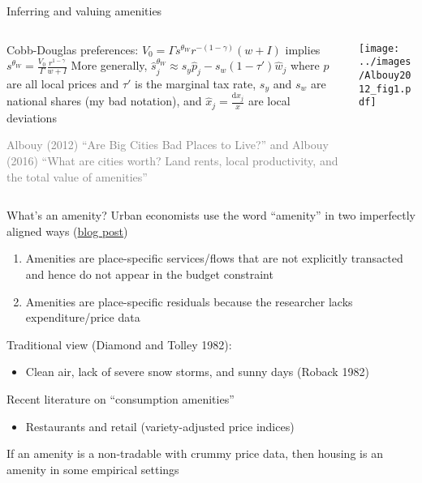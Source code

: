 \documentclass[11pt,notes=hide,aspectratio=169]{beamer}
\begin{document}
\begin{frame}{Inferring and valuing amenities}
\begin{columns}
\begin{column}{0.49\textwidth}
Cobb-Douglas preferences:
$V_0  = 
\Gamma
s^{\theta_W}
r^{-(1-\gamma)}
(w + I)$
implies
$
s^{\theta_W} = \frac{V_0}{\Gamma} \frac{r^{1-\gamma}}{w+I} 
$
\smallskip
More generally,
$\hat{s}_j^{\theta_W} \approx s_y \hat{p}_j - s_w (1-\tau')\hat{w}_j$
where $p$ are all local prices and $\tau'$ is the marginal tax rate,
$s_y$ and $s_w$ are national shares (my bad notation), and $\hat{x}_j = \frac{\textrm{d} x_j}{x}$ are local deviations
{\scriptsize \textcolor{gray}{
Albouy (2012) ``Are Big Cities Bad Places to Live?''
and
Albouy (2016) ``What are cities worth? Land rents, local productivity, and the total value of amenities''
}\par}
\end{column}
\begin{column}{0.40\textwidth}
\texttt{[image: ../images/Albouy2012\_fig1.pdf]}
\end{column}
\end{columns}
\end{frame}
\begin{frame}{What's an amenity?}
Urban economists use the word ``amenity'' in two imperfectly aligned ways
(\href{https://tradediversion.net/2023/11/26/the-two-notions-of-amenities-in-spatial-economics/}{blog post})
\begin{enumerate}
\item Amenities are place-specific services/flows that are not explicitly transacted and hence do not appear in the budget constraint
\item Amenities are place-specific residuals because the researcher lacks expenditure/price data
\end{enumerate}
Traditional view (Diamond and Tolley 1982):
\begin{itemize}
\item Clean air, lack of severe snow storms, and sunny days (Roback 1982)
\end{itemize}
Recent literature on ``consumption amenities''
\begin{itemize}
\item Restaurants and retail (variety-adjusted price indices)
\end{itemize}
If an amenity is a non-tradable with crummy price data, then housing is an amenity in some empirical settings
\end{frame}
\end{document}
